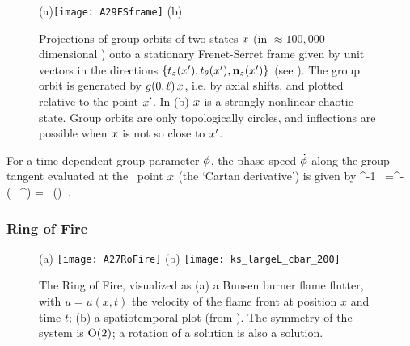 \begin{figure}
  \centering
(a)\texttt{[image: A29FSframe]}
(b)%
  \caption{\label{fig:2840GOt135th0}
Projections of group orbits of two states $x$ (in $\approx
100,000$-dimensional {\statesp}) onto a stationary Frenet-Serret frame
given by unit vectors in the directions
$\{t_z(x'),t_\theta(x'),\mathbf{n}_z(x')\}$ (see
). The group orbit is generated by
$g(0,\ell)\,x$, i.e. by axial shifts, and plotted relative to the
point $x'$.
In  (b) $x$ is a strongly nonlinear chaotic state.
Group orbits are only topologically circles, and inflections are possible
when $x$ is not so close to $x'$.
  }
\end{figure}

For a time-dependent group parameter
${\bf \phi}$, the phase speed $\dot{{\bf \phi}}$ along the group tangent
evaluated at the \statesp\ point $x$ (the `Cartan derivative') is
given by
\beq
\LieEl^{-1}\dot{\LieEl} \,\ssp %
     =^{-\gSpace \Lg} \,
\left( \, %
                             ^{\gSpace \Lg}\right)\ssp
    =\dot{\gSpace} \, \groupTan(\ssp)
\,.



\subsubsection{Ring of Fire}

\begin{figure}
(a) \texttt{[image: A27RoFire]}
(b) \texttt{[image: ks\_largeL\_cbar\_200]}
  \caption{
The Ring of Fire, visualized as
    (a)
a Bunsen burner flame flutter, with $u=u(x,t)$ the velocity of the
flame front at position $x$ and time $t$;
    (b)
a spatiotemporal plot (from \wwwcb{}). The symmetry of the system is
$\textrm{O}(2)$; a rotation of a solution is also a solution.
  }
\label{fig:A27RoFir}
\end{figure}

